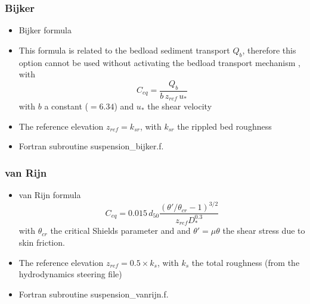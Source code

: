 \subsubsection{Bijker}
\begin{itemize}
\item Bijker formula 
\item This formula is related to the bedload sediment transport $Q_b$, therefore this option cannot be used without activating the bedload transport mechanism , with 
\begin{equation*}
C_{eq} =\frac{Q_b}{b\,z_{ref}\,u_*}
\end{equation*}
with $b$ a constant ($=6.34$) and $u_*$ the shear velocity
\item The reference elevation $z_{ref}=k_{sr}$, with $k_{sr}$ the rippled bed roughness 
\item Fortran subroutine {\ttfamily suspension\_bijker.f}.
\end{itemize}

\subsubsection{van Rijn}
\begin{itemize}
\item van Rijn formula~\cite{vanRijn84b} 
\begin{equation*}
C_{eq} =0.015\,d_{50}\frac{\left(\theta'/\theta_{cr}-1\right)^{3/2}}{z_{ref}D_*^{0.3}}
\end{equation*}
with $\theta_{cr}$ the critical Shields parameter and and $\theta'= \mu\theta$ the shear stress due to skin friction.
\item The reference elevation $z_{ref}=0.5 \times k_s$, with $k_s$ the total roughness (from the hydrodynamics steering file)
\item Fortran subroutine {\ttfamily suspension\_vanrijn.f}.
\end{itemize}

